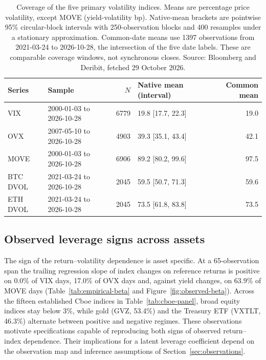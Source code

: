 \begin{table}[htbp]\centering\small\setlength{\tabcolsep}{4pt}
\begin{tabular}{@{}l P{39mm} r P{31mm} r@{}}\toprule Series & Sample & $N$ & Native mean (interval) & Common mean\\\midrule

VIX & 2000-01-03 to 2026-10-28 & 6779 & 19.8 [17.7, 22.3] & 19.0 \\

OVX & 2007-05-10 to 2026-10-28 & 4903 & 39.3 [35.1, 43.4] & 42.1 \\

MOVE & 2000-01-03 to 2026-10-28 & 6906 & 89.2 [80.2, 99.6] & 97.5 \\

BTC DVOL & 2021-03-24 to 2026-10-28 & 2045 & 59.5 [50.7, 71.3] & 59.6 \\

ETH DVOL & 2021-03-24 to 2026-10-28 & 2045 & 73.5 [61.8, 83.8] & 73.5 \\

\bottomrule\end{tabular}
\caption{Coverage of the five primary volatility indices. Means are percentage
price volatility, except MOVE (yield-volatility bp). Native-mean brackets are
pointwise 95\% circular-block intervals with 250-observation blocks and 400
resamples under a stationary approximation. Common-date means use 1397 observations from 2021-03-24 to 2026-10-28, the intersection of the five date labels.
These are comparable coverage windows, not synchronous closes. Source: Bloomberg
and Deribit, fetched 29 October 2026.}
\label{tab:empirical-data}\end{table}

\subsection{Observed leverage signs across assets}
\label{sec:empirical-beta}
The sign of the return--volatility dependence is asset specific. At a 65-observation span
the trailing regression slope of index changes on reference returns is positive on
0.0\% of VIX days, 17.0\% of OVX days and, against yield changes, on 63.9\% of MOVE days (Table~\ref{tab:empirical-beta} and
Figure~\ref{fig:observed-beta}). Across the fifteen established Cboe indices in
Table~\ref{tab:cboe-panel}, broad equity indices stay below 3\%, while gold
(GVZ, 53.4\%) and the Treasury ETF (VXTLT, 46.3\%) alternate between positive and negative regimes.
These observations motivate specifications capable of reproducing both signs of
observed return--index dependence. Their implications for a latent leverage
coefficient depend on the observation map and inference assumptions of
Section~\ref{sec:observations}.

